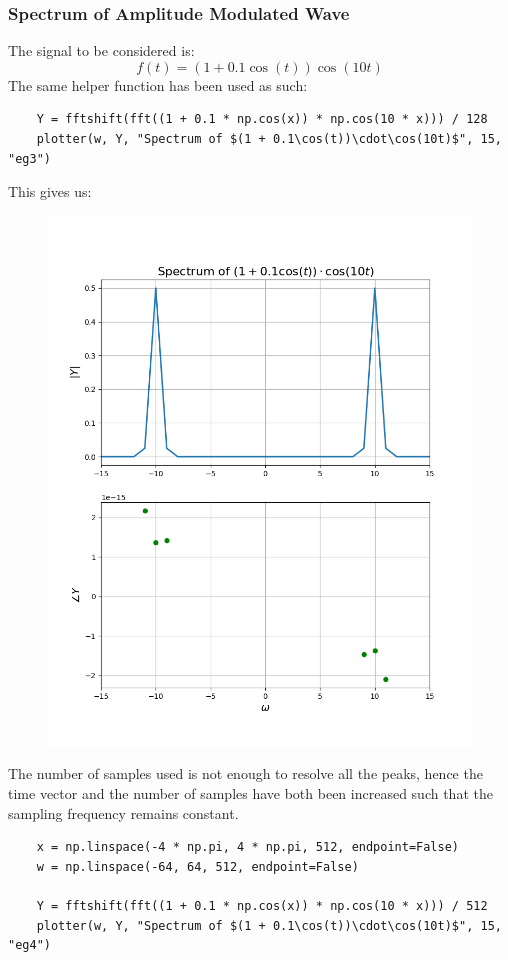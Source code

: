 \documentclass[12pt, a4paper]{article}
\begin{document}
\subsubsection{Spectrum of Amplitude Modulated Wave}
The signal to be considered is:
\begin{equation*}
    f(t) = (1 + 0.1\cos(t))\cos(10t)
\end{equation*}
The same helper function has been used as such:
\begin{lstlisting}
    Y = fftshift(fft((1 + 0.1 * np.cos(x)) * np.cos(10 * x))) / 128
    plotter(w, Y, "Spectrum of $(1 + 0.1\cos(t))\cdot\cos(10t)$", 15, "eg3")
\end{lstlisting}
This gives us:
\begin{figure}[H]
    \centering
    \includegraphics[scale=0.6]{eg3.png}
\end{figure}
The number of samples used is not enough to resolve all the peaks, hence the time vector and the number of
samples have both been increased such that the sampling frequency remains constant.
\begin{lstlisting}
    x = np.linspace(-4 * np.pi, 4 * np.pi, 512, endpoint=False)
    w = np.linspace(-64, 64, 512, endpoint=False)

    Y = fftshift(fft((1 + 0.1 * np.cos(x)) * np.cos(10 * x))) / 512
    plotter(w, Y, "Spectrum of $(1 + 0.1\cos(t))\cdot\cos(10t)$", 15, "eg4")
\end{lstlisting}
\end{document}

